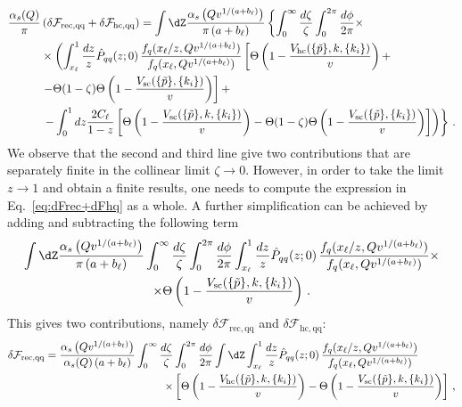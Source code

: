 \begin{equation}
  \begin{aligned}
    \label{eq:dFrec+dFhq}
\frac{\alpha_s(Q)}{\pi}&\left(\delta \mathcal{F}_{\mathrm{rec,qq}}+\delta \mathcal{F}_{\mathrm{hc,qq}}\right)=\int \dZ \frac{\alpha_s\left(Qv^{1/(a+b_\ell)}\right)}{\pi\left(a+b_\ell\right)}\left\{\int_0^\infty\frac{d\zeta}{\zeta}\int_0^{2\pi}\frac{d\phi}{2\pi}\times\right. \\
&\times \left(\int_{x_\ell}^1 \frac{dz}{z} \hat P_{qq}(z;0)\,\frac{f_q(x_\ell/z,Qv^{1/(a+b_\ell)})}{f_q(x_\ell,Qv^{1/(a+b_\ell)})}
\left[\Theta\left(1-\frac{V_{\mathrm{hc}}(\{\tilde{p}\},k,\{k_i\})}{v}\right)+\right.\right.\\
&\left.-\Theta(1-\zeta)\Theta\left(1-\frac{V_{\mathrm{sc}}(\{\tilde{p}\},\{k_i\})}{v}\right)\right] +\\
&\left.\left.-\int_0^1 dz \frac{2C_\ell}{1-z}\left[\Theta\left(1-\frac{V_{\mathrm{sc}}(\{\tilde{p}\},k,\{k_i\})}{v}\right) -\Theta(1-\zeta)\Theta\left(1-\frac{V_{\mathrm{sc}}(\{\tilde{p}\},\{k_i\})}{v}\right)\right]\right)\right\}\,.
\end{aligned}
\end{equation}
We observe that the second and third line give two contributions that
are separately finite in the collinear limit $\zeta\to 0$. However, in
order to take the limit
$z\to 1$ and obtain a finite results, one needs to compute the expression in
Eq.~\eqref{eq:dFrec+dFhq} as a whole. A further simplification can be achieved by adding and subtracting the following term
\begin{multline}
  \label{eq:dFhc-sub}
  \int \dZ \frac{\alpha_s\left(Q v^{1/(a+b_\ell)}\right)}{\pi\left(a+b_\ell\right)}\int_0^\infty\frac{d\zeta}{\zeta}\int_0^{2\pi}\frac{d\phi}{2\pi}
 \int_{x_\ell}^1 \frac{dz}{z}  \hat P_{qq}(z;0)\, \frac{f_q(x_\ell/z,Qv^{1/(a+b_\ell)})}{f_q(x_\ell,Qv^{1/(a+b_\ell)})}\times\\
 \times\Theta\left(1-\frac{V_{\mathrm{sc}}(\{\tilde{p}\},k,\{k_i\})}{v}\right)\,.
\end{multline}
This gives two contributions, namely $\delta \mathcal{F}_{\mathrm{rec,qq}}$ and $\delta \mathcal{F}_{\mathrm{hc,qq}}$:
\begin{equation}
\label{eq:dFrec-qq}
\begin{aligned}
\delta \mathcal{F}_{\mathrm{rec,qq}} = \frac{\alpha_s\left(Q v^{1/(a+b_\ell)}\right)}{\alpha_s(Q)\left(a+b_\ell\right)}\int_0^\infty\frac{d\zeta}{\zeta}&\int_0^{2\pi}\frac{d\phi}{2\pi} \int \dZ\int_{x_\ell}^1 \frac{dz}{z} \hat P_{qq}(z;0)\,\frac{f_q(x_\ell/z,Qv^{1/(a+b_\ell)})}{f_q(x_\ell,Qv^{1/(a+b_\ell)})} \\
\times  
&\left[\Theta\left(1-\frac{V_{\mathrm{hc}}(\{\tilde{p}\},k,\{k_i\})}{v}\right)-\Theta\left(1-\frac{V_{\mathrm{sc}}(\{\tilde{p}\},k,\{k_i\})}{v}\right)\right]\,,
\end{aligned}
\end{equation}
